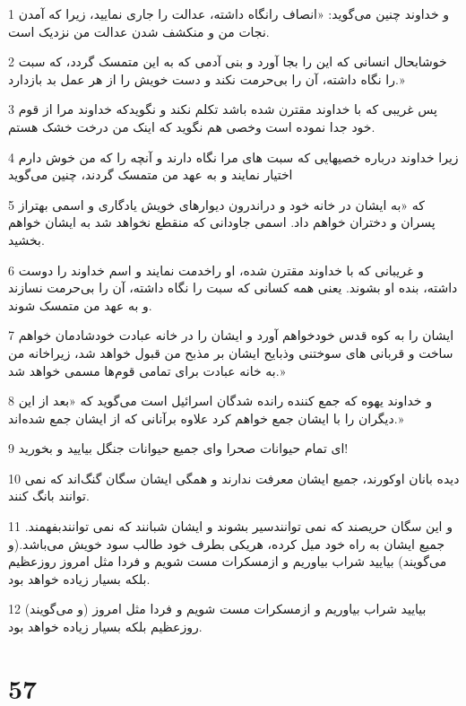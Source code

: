 \par 1 و خداوند چنین می‌گوید: «انصاف رانگاه داشته، عدالت را جاری نمایید، زیرا که آمدن نجات من و منکشف شدن عدالت من نزدیک است.
\par 2 خوشابحال انسانی که این را بجا آورد و بنی آدمی که به این متمسک گردد، که سبت را نگاه داشته، آن را بی‌حرمت نکند و دست خویش را از هر عمل بد باز‌دارد.»
\par 3 پس غریبی که با خداوند مقترن شده باشد تکلم نکند و نگویدکه خداوند مرا از قوم خود جدا نموده است وخصی هم نگوید که اینک من درخت خشک هستم.
\par 4 زیرا خداوند درباره خصیهایی که سبت های مرا نگاه دارند و آنچه را که من خوش دارم اختیار نمایند و به عهد من متمسک گردند، چنین می‌گوید
\par 5 که «به ایشان در خانه خود و دراندرون دیوارهای خویش یادگاری و اسمی بهتراز پسران و دختران خواهم داد. اسمی جاودانی که منقطع نخواهد شد به ایشان خواهم بخشید.
\par 6 و غریبانی که با خداوند مقترن شده، او راخدمت نمایند و اسم خداوند را دوست داشته، بنده او بشوند. یعنی همه کسانی که سبت را نگاه داشته، آن را بی‌حرمت نسازند و به عهد من متمسک شوند.
\par 7 ایشان را به کوه قدس خودخواهم آورد و ایشان را در خانه عبادت خودشادمان خواهم ساخت و قربانی های سوختنی وذبایح ایشان بر مذبح من قبول خواهد شد، زیراخانه من به خانه عبادت برای تمامی قوم‌ها مسمی خواهد شد.»
\par 8 و خداوند یهوه که جمع کننده رانده شدگان اسرائیل است می‌گوید که «بعد از این دیگران را با ایشان جمع خواهم کرد علاوه برآنانی که از ایشان جمع شده‌اند.»
\par 9 ‌ای تمام حیوانات صحرا و‌ای جمیع حیوانات جنگل بیایید و بخورید!
\par 10 دیده بانان اوکورند، جمیع ایشان معرفت ندارند و همگی ایشان سگان گنگ‌اند که نمی توانند بانگ کنند.
\par 11 و این سگان حریصند که نمی توانندسیر بشوند و ایشان شبانند که نمی توانندبفهمند. جمیع ایشان به راه خود میل کرده، هریکی بطرف خود طالب سود خویش می‌باشد.(و می‌گویند) بیایید شراب بیاوریم و ازمسکرات مست شویم و فردا مثل امروز روزعظیم بلکه بسیار زیاده خواهد بود.
\par 12 (و می‌گویند) بیایید شراب بیاوریم و ازمسکرات مست شویم و فردا مثل امروز روزعظیم بلکه بسیار زیاده خواهد بود.
 
\chapter{57}


